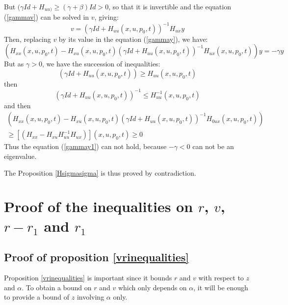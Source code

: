 \documentclass[a4paper,10pt]{article}
\begin{document}
    But $(\gamma Id + H_{uu)} \ge ( \gamma + \beta ) Id > 0 $, so that it 
    is invertible and the equation (\ref{gammav}) can be solved in 
    $v$, giving:
    \begin{equation}
        v = (\gamma Id + H_{uu}(x,u,p_{0},t))^{-1} H_{ux}y
        \label{vsolved}
    \end{equation}
    Then, replacing $v$ by its value in the equation (\ref{gammay}), we have:
    \begin{equation}
        (H_{xx}(x,u,p_{0},t) - H_{xu}(x,u,p_{0},t)(\gamma Id + H_{uu}(x,u,p_{0},t))^{-1} H_{ux}(x,u,p_{0},t)) y = -\gamma y
        \label{gammay1}
    \end{equation}
    But as $\gamma > 0$, we have the succession of inequalities:  
\[
        (\gamma Id + H_{uu}(x,u,p_{0},t)) \ge H_{uu}(x,u,p_{0},t) 
\]
	then
\[
        (\gamma Id + H_{uu}(x,u,p_{0},t))^{-1} \le H_{uu}^{-1}(x,u,p_{0},t) 
\]
	and then
\begin{align*}
          (H_{xx}(x,u,p_{0},t) - H_{xu}(x,u,p_{0},t)(\gamma Id + 
	  H_{uu}(x,u,p_{0},t))^{-1} H_{0ux}(x,u,p_{0},t)) \\
          \ge \left[(H_{xx}- H_{xu} H_{uu}^{-1} H_{ux})\right](x,u,p_{0},t) \ge 0
\end{align*}
    Thus the equation (\ref{gammay1}) can not hold, because $-\gamma < 
    0$ can not be an eigenvalue.
	
The Proposition \ref{Hsigmasigma} is thus proved by contradiction.

\section{Proof of the inequalities on $r$, $v$, $r-r_{1}$ and $r_{1}$}
\subsection{Proof of proposition 
\ref{vrinequalities}}\label{vrinequalitiesproof}
Proposition \ref{vrinequalities} is important since it bounds $r$ and 
$v$ with respect to $z$ and $\alpha$. To obtain a bound on $r$ and 
$v$ which only depends on $\alpha$, it will be enough to provide a bound of 
$z$ involving $\alpha$ only.
\end{document}
